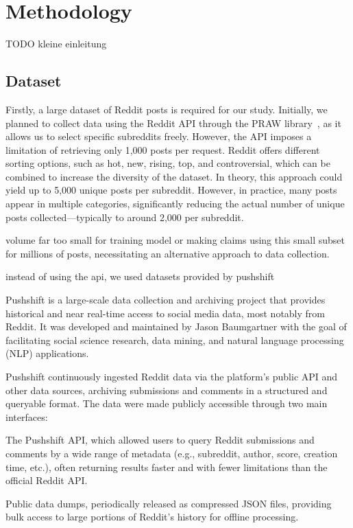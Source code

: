 \chapter{Methodology}
TODO kleine einleitung



\section{Dataset}

Firstly, a large dataset of Reddit posts is required for our study. 
Initially, we planned to collect data using the Reddit API through the PRAW library~\cite{praw}, as it allows us to select specific subreddits freely. 
However, the API imposes a limitation of retrieving only 1,000 posts per request. 
Reddit offers different sorting options, such as hot, new, rising, top, and controversial, which can be combined to increase the diversity of the dataset. 
In theory, this approach could yield up to 5,000 unique posts per subreddit. 
However, in practice, many posts appear in multiple categories, significantly reducing the actual number of unique posts collected—typically to around 2,000 per subreddit. 

volume far too small for training model or making claims using this small subset for millions of posts, necessitating an alternative approach to data collection.

instead of using the api, we used datasets provided by pushshift~\cite{baumgartner2020pushshiftredditdataset}

Pushshift is a large-scale data collection and archiving project that provides historical and near real-time access to social media data, most notably from Reddit. It was developed and maintained by Jason Baumgartner with the goal of facilitating social science research, data mining, and natural language processing (NLP) applications.

Pushshift continuously ingested Reddit data via the platform’s public API and other data sources, archiving submissions and comments in a structured and queryable format. The data were made publicly accessible through two main interfaces:

The Pushshift API, which allowed users to query Reddit submissions and comments by a wide range of metadata (e.g., subreddit, author, score, creation time, etc.), often returning results faster and with fewer limitations than the official Reddit API.

Public data dumps, periodically released as compressed JSON files, providing bulk access to large portions of Reddit’s history for offline processing.

